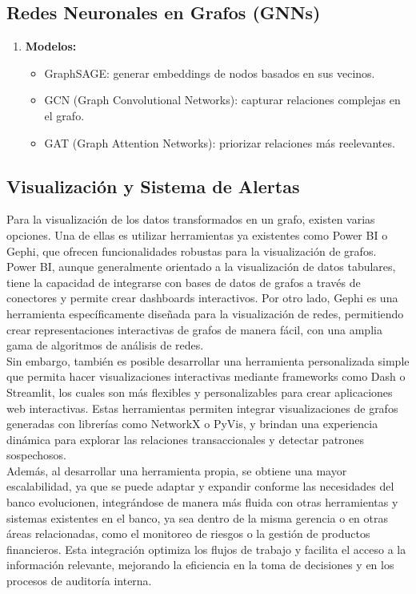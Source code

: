 \subsection{Redes Neuronales en Grafos (GNNs)}
\begin{enumerate}
    \item \textbf{Modelos:} 
    \begin{itemize}
        \item GraphSAGE: generar embeddings de nodos basados en sus vecinos.
        \item GCN (Graph Convolutional Networks): capturar relaciones complejas en el grafo.
        \item GAT (Graph Attention Networks): priorizar relaciones más reelevantes.
    \end{itemize}
\end{enumerate}

\subsection{Visualización y Sistema de Alertas}

Para la visualización de los datos transformados en un grafo, existen varias opciones. Una de ellas es utilizar herramientas ya existentes como Power BI o Gephi, que ofrecen funcionalidades robustas para la visualización de grafos. Power BI, aunque generalmente orientado a la visualización de datos tabulares, tiene la capacidad de integrarse con bases de datos de grafos a través de conectores y permite crear dashboards interactivos. Por otro lado, Gephi es una herramienta específicamente diseñada para la visualización de redes, permitiendo crear representaciones interactivas de grafos de manera fácil, con una amplia gama de algoritmos de análisis de redes. \\

Sin embargo, también es posible desarrollar una herramienta personalizada simple que permita hacer visualizaciones interactivas mediante frameworks como Dash o Streamlit, los cuales son más flexibles y personalizables para crear aplicaciones web interactivas. Estas herramientas permiten integrar visualizaciones de grafos generadas con librerías como NetworkX o PyVis, y brindan una experiencia dinámica para explorar las relaciones transaccionales y detectar patrones sospechosos. \\

Además, al desarrollar una herramienta propia, se obtiene una mayor escalabilidad, ya que se puede adaptar y expandir conforme las necesidades del banco evolucionen, integrándose de manera más fluida con otras herramientas y sistemas existentes en el banco, ya sea dentro de la misma gerencia o en otras áreas relacionadas, como el monitoreo de riesgos o la gestión de productos financieros. Esta integración optimiza los flujos de trabajo y facilita el acceso a la información relevante, mejorando la eficiencia en la toma de decisiones y en los procesos de auditoría interna. \\


